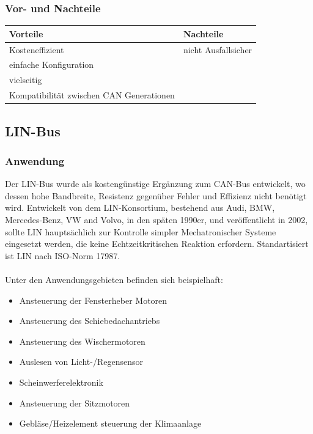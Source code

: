     \subsubsection{Vor- und Nachteile}
    \begin{center}
        \begin{tabular}{l|l}
            \textbf{Vorteile} & \textbf{Nachteile}\\
            \hline Kosteneffizient & nicht Ausfallsicher\\
            \hline einfache Konfiguration & \\
            \hline vielseitig & \\
            \hline Kompatibilität zwischen CAN Generationen & \\
            \hline
        \end{tabular}            
    \end{center}
    
\subsection{LIN-Bus}
    \subsubsection{Anwendung}
    Der LIN-Bus wurde als kostengünstige Ergänzung zum CAN-Bus entwickelt, wo dessen hohe
    Bandbreite, Resistenz gegenüber Fehler und Effizienz nicht benötigt wird. Entwickelt 
    von dem LIN-Konsortium, bestehend aus Audi, BMW, Mercedes-Benz, VW and Volvo, in den 
    späten 1990er, und veröffentlicht in 2002, sollte LIN hauptsächlich zur Kontrolle 
    simpler Mechatronischer Systeme eingesetzt werden, die keine Echtzeitkritischen Reaktion 
    erfordern. Standartisiert ist LIN nach ISO-Norm 17987.
    ~\cite{reif2011bosch}\\\\
    Unter den Anwendungsgebieten befinden sich beispielhaft:
    \begin{itemize}
    \item Ansteuerung der Fensterheber Motoren
    \item Ansteuerung des Schiebedachantriebs
    \item Ansteuerung des Wischermotoren
    \item Auslesen von Licht-/Regensensor
    \item Scheinwerferelektronik
    \item Ansteuerung der Sitzmotoren
    \item Gebläse/Heizelement steuerung der Klimaanlage
    \end{itemize}

